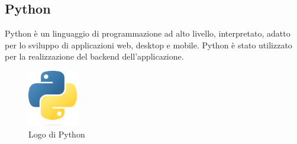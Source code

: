 \subsection{Python}
Python è un linguaggio di programmazione ad alto livello, interpretato, adatto per lo sviluppo di applicazioni web, desktop e mobile. Python è stato utilizzato per la realizzazione del backend dell'applicazione.

\begin{figure}[h]
  \centering
  \includegraphics[width=0.2\textwidth]{img/tecnologie/python.png}
  \caption{Logo di Python}
  \label{fig:python}
\end{figure}